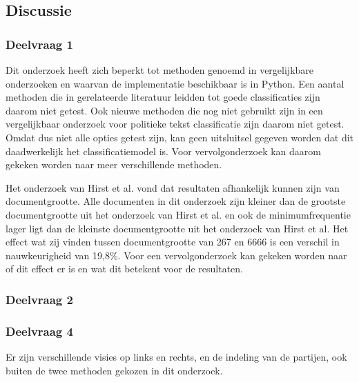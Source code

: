 \subsection{Discussie}
\subsubsection{Deelvraag 1}
Dit onderzoek heeft zich beperkt tot methoden genoemd in vergelijkbare onderzoeken en waarvan de implementatie beschikbaar is in Python. Een aantal methoden die in gerelateerde literatuur leidden tot goede classificaties zijn daarom niet getest. Ook nieuwe methoden die nog niet gebruikt zijn in een vergelijkbaar onderzoek voor politieke tekst classificatie zijn daarom niet getest. Omdat dus niet alle opties getest zijn, kan geen uitsluitsel gegeven worden dat dit daadwerkelijk het classificatiemodel is. Voor vervolgonderzoek kan daarom gekeken worden naar meer verschillende methoden.\par
Het onderzoek van Hirst et al. vond dat resultaten afhankelijk kunnen zijn van documentgrootte. Alle documenten in dit onderzoek zijn kleiner dan de grootste documentgrootte uit het onderzoek van Hirst et al. en ook de minimumfrequentie lager ligt dan de kleinste documentgrootte uit het onderzoek van Hirst et al.
Het effect wat zij vinden tussen documentgrootte van 267 en 6666 is een verschil in nauwkeurigheid van 19,8\%. Voor een vervolgonderzoek kan gekeken worden naar of dit effect er is en wat dit betekent voor de resultaten.\par

\subsubsection{Deelvraag 2}


\subsubsection{Deelvraag 4}
Er zijn verschillende visies op links en rechts, en de indeling van de partijen, ook buiten de twee methoden gekozen in dit onderzoek.\par
